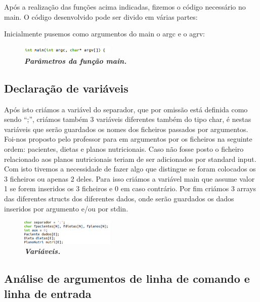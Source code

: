 \documentclass[a4wide]{report}
\begin{document}
\Large
Após a realização das funções acima indicadas, fizemos o código necessário no main. O código desenvolvido pode ser divido em várias partes: 

Inicialmente pusemos como argumentos do main o argc e o agrv: 

\begin{figure}[hbt]
    \centering
    \includegraphics[width=0.40\textwidth]{main.png}
    \caption{\textbf{\textit{Parâmetros da função main.}}\label{fig:imagem}}
\end{figure}


\subsection{Declaração de variáveis}

\Large
Após isto criámos a variável do separador, que por omissão está definida como sendo “;”, criámos também 3 variáveis diferentes também do tipo char, é nestas variáveis que serão guardados os nomes dos ficheiros passados por argumentos. Foi-nos proposto pelo professor para em argumentos por os ficheiros na seguinte ordem: pacientes, dietas e planos nutricionais. Caso não fosse posto o ficheiro relacionado aos planos nutricionais teriam de ser adicionados por standard input. Com isto tivemos a necessidade de fazer algo que distingue se foram colocados os 3 ficheiros ou apenas 2 deles. Para isso criámos a variável main que assume valor 1 se forem inseridos os 3 ficheiros e 0 em caso contrário. Por fim criámos 3 arrays das diferentes structs dos diferentes dados, onde serão guardados os dados inseridos por argumento e/ou por stdin.

\begin{figure}[hbt]
    \centering
    \includegraphics[width=0.40\textwidth]{variaveis.png}
    \caption{\textbf{\textit{Variáveis.}}\label{fig:imagem}}
\end{figure}

\subsection{Análise de argumentos de linha de comando e linha de entrada}
\end{document}
